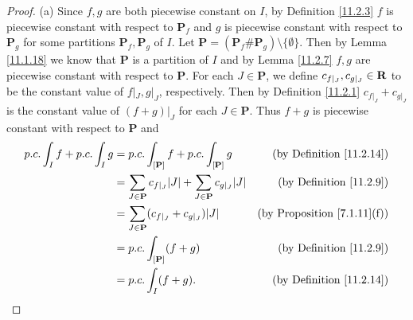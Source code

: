 \begin{proof}{(a)}
    Since \(f, g\) are both piecewise constant on \(I\), by Definition \ref{11.2.3} \(f\) is piecewise constant with respect to \(\mathbf{P}_f\) and \(g\) is piecewise constant with respect to \(\mathbf{P}_g\) for some partitions \(\mathbf{P}_f, \mathbf{P}_g\) of \(I\).
    Let \(\mathbf{P} = (\mathbf{P}_f \# \mathbf{P}_g) \setminus \{\emptyset\}\).
    Then by Lemma \ref{11.1.18} we know that \(\mathbf{P}\) is a partition of \(I\) and by Lemma \ref{11.2.7} \(f, g\) are piecewise constant with respect to \(\mathbf{P}\).
    For each \(J \in \mathbf{P}\), we define \(c_{f|_J}, c_{g|_J} \in \mathbf{R}\) to be the constant value of \(f|_J, g|_J\), respectively.
    Then by Definition \ref{11.2.1} \(c_{f|_J} + c_{g|_J}\) is the constant value of \((f + g)|_J\) for each \(J \in \mathbf{P}\).
    Thus \(f + g\) is piecewise constant with respect to \(\mathbf{P}\) and
    \begin{align*}
        p.c. \int_I f + p.c. \int_I g & = p.c. \int_{[\mathbf{P}]} f + p.c. \int_{[\mathbf{P}]} g                             & \text{(by Definition \ref{11.2.14})}    \\
                                      & = \sum_{J \in \mathbf{P}} c_{f|_J} \abs{J} + \sum_{J \in \mathbf{P}} c_{g|_J} \abs{J} & \text{(by Definition \ref{11.2.9})}     \\
                                      & = \sum_{J \in \mathbf{P}} (c_{f|_J} + c_{g|_J}) \abs{J}                               & \text{(by Proposition \ref{7.1.11}(f))} \\
                                      & = p.c. \int_{[\mathbf{P}]} (f + g)                                                    & \text{(by Definition \ref{11.2.9})}     \\
                                      & = p.c. \int_I (f + g).                                                                & \text{(by Definition \ref{11.2.14})}
    \end{align*}
\end{proof}


